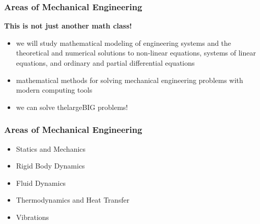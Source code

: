\documentclass[fleqn]{ltx-talk} %
\newcommand{\sectionIsubsectionIItitle}{Areas of Mechanical Engineering}
\begin{document}
		\begin{frame}
			\frametitle{\sectionIsubsectionIItitle}

			\textbf{This is not just another math class!}\\

			\begin{itemize}
				\item we will study mathematical modeling of engineering systems and the theoretical and numerical solutions to non-linear equations, systems of linear equations, and ordinary and partial differential equations\\
				\item mathematical methods for solving mechanical engineering problems with modern computing tools\\
				\item we can solve thelarge{BIG} problems!
			\end{itemize}  

			\btVFill
		\end{frame}

		\begin{frame}
			\frametitle{\sectionIsubsectionIItitle}

			\begin{itemize}
				\item Statics and Mechanics\\
				\item Rigid Body Dynamics\\
				\item Fluid Dynamics\\
				\item Thermodynamics and Heat Transfer\\
				\item Vibrations\\
			\end{itemize}  

			\btVFill
		\end{frame}

\end{document}
